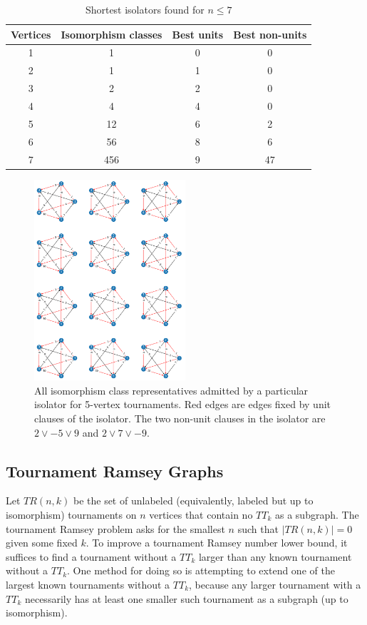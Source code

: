 \documentclass[conference]{IEEEtran}
\begin{document}
\begin{table}[ht]
    \centering
        \caption{Shortest isolators found for $n\le 7$}
    \begin{tabular}{c|c|c|c}
        Vertices & Isomorphism classes &Best units & Best non-units  \\ \hline
        1&1&0&0\\ 
        2&1&1&0\\ 
        3&2&2&0\\ 
        4&4&4&0\\
        5&12&6&2\\ 
        6&56&8&6\\ 
        7&456&9&47\\ 
    \end{tabular}

    \label{tab:smallest_isolators_found}
\end{table}

\begin{figure}
\centering
\includegraphics[width=0.5\textwidth]{iso_5.png}
\caption{All isomorphism class representatives admitted by a particular isolator for 5-vertex tournaments. Red edges are edges fixed by unit clauses of the isolator. The two non-unit clauses in the isolator are $2 \lor -5 \lor 9$ and $2 \lor 7 \lor -9$.} \label{fig2}
\end{figure}

\subsection{Tournament Ramsey Graphs}

Let $TR(n, k)$ be the set of unlabeled (equivalently, labeled but up to isomorphism) tournaments on $n$ vertices that contain no $TT_k$ as a subgraph. The tournament Ramsey problem asks for the smallest $n$ such that $|TR(n, k)| = 0$ given some fixed $k$. To improve a tournament Ramsey number lower bound, it suffices to find a tournament without a $TT_k$ larger than any known tournament without a $TT_k$. One method for doing so is attempting to extend one of the largest known tournaments without a $TT_k$, because any larger tournament with a $TT_k$ necessarily has at least one smaller such tournament as a subgraph (up to isomorphism).
\end{document}
